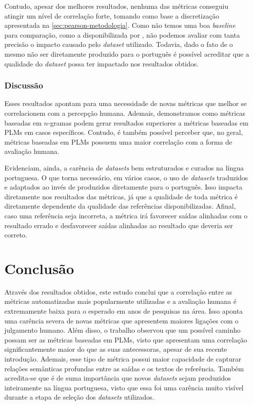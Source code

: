 \documentclass[cic,tc]{iiufrgs}
\begin{document}
Contudo, apesar dos melhores resultados, nenhuma das métricas conseguiu atingir um nível de correlação forte, tomando como base a discretização apresentada na \autoref{sec:pearson-metodologia}. Como não temos uma boa \textit{baseline} para comparação, como a disponibilizada por \citet{fabbri2021summeval}, não podemos avaliar com tanta precisão o impacto causado pelo \textit{dataset} utilizado. Todavia, dado o fato de o mesmo não ser diretamente produzido para o português é possível acreditar que a qualidade do \textit{dataset} possa ter impactado nos resultados obtidos.

\subsection{Discussão}
Esses resultados apontam para uma necessidade de novas métricas que melhor se correlacionem com a percepção humana. Ademais, demonstramos como métricas baseadas em $n$-gramas podem gerar resultados superiores a métricas baseadas em PLMs em casos específicos. Contudo, é também possível perceber que, no geral, métricas baseadas em PLMs possuem uma maior correlação com a forma de avaliação humana.

Evidenciam, ainda, a carência de \textit{datasets} bem estruturados e curados na língua portuguesa. O que torna necessário, em vários casos, o uso de \textit{datasets} traduzidos e adaptados ao invés de produzidos diretamente para o português. Isso impacta diretamente nos resultados das métricas, já que a qualidade de toda métrica é diretamente dependente da qualidade das referências disponibilizadas. Afinal, caso uma referência seja incorreta, a métrica irá favorecer saídas alinhadas com o resultado errado e desfavorecer saídas alinhadas ao resultado que deveria ser correto.

\chapter{Conclusão}
\label{cap:conclusão}
Através dos resultados obtidos, este estudo conclui que a correlação entre as métricas automatizadas mais popularmente utilizadas e a avaliação humana é extremamente baixa para o esperado em anos de pesquisas na área. Isso aponta uma carência severa de novas métricas que apresentem maiores ligações com o julgamento humano. Além disso, o trabalho observou que um possível caminho possam ser as métricas baseadas em PLMs, visto que apresentam uma correlação significantemente maior do que as suas antecessoras, apesar de sua recente introdução. Ademais, esse tipo de métrica possui maior capacidade de capturar relações semânticas profundas entre as saídas e os textos de referência. Também acredita-se que é de suma importância que novos \textit{datasets} sejam produzidos inteiramente na língua portuguesa, visto que essa foi uma carência muito visível durante a etapa de seleção dos \textit{datasets} utilizados.
\end{document}
